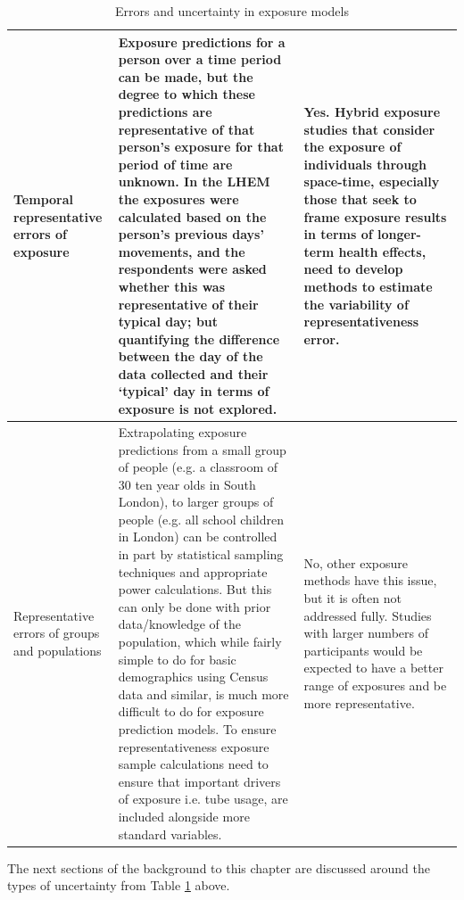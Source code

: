 \begin{landscape}
\begin{table}[ht]
\begin{tabular}{ | p{3.2cm} | p{13.2cm} | p{7.9cm} |}
        Temporal representative errors of exposure  &   Exposure predictions for a person over a time period can be made, but the degree to which these predictions are representative of that person’s exposure for that period of time are unknown. In the LHEM the exposures were calculated based on the person’s previous days’ movements, and the respondents were asked whether this was representative of their typical day; but quantifying the difference between the day of the data collected and their ‘typical’ day in terms of exposure is not explored.         &    Yes. Hybrid exposure studies that consider the exposure of individuals through space-time, especially those that seek to frame exposure results in terms of longer-term health effects, need to develop methods to estimate the variability of representativeness error.       \\ \hline
        
        Representative errors of groups and populations  &   Extrapolating exposure predictions from a small group of people (e.g. a classroom of 30 ten year olds in South London), to larger groups of people (e.g. all school children in London) can be controlled in part by statistical sampling techniques and appropriate power calculations. But this can only be done with prior data/knowledge of the population, which while fairly simple to do for basic demographics using Census data and similar, is much more difficult to do for exposure prediction models. To ensure representativeness exposure sample calculations need to ensure that important drivers of exposure i.e. tube usage, are included alongside more standard variables.        &   No, other exposure methods have this issue, but it is often not addressed fully. Studies with larger numbers of participants would be expected to have a better range of exposures and be more representative.        \\ \hline
\end{tabular}
\caption{Errors and uncertainty in exposure models}
\label{tab:exposure_error_table}
\vspace{-1pt}
\end{table}

\end{landscape}

\restoregeometry

The next sections of the background to this chapter are discussed around the types of uncertainty from Table \ref{tab:exposure_error_table} above.

